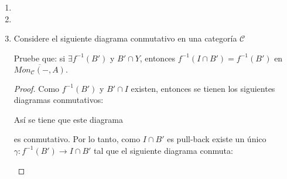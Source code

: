 \documentclass{article}
\begin{document}
\begin{enumerate}[label=\textbf{Ej \arabic*.}]
\begin{proof}
Veamos que $\nu$ es morfismo. Si $r\in R\,\,a,b\in J'$ donde $\nu(a)=[x]$, $\nu(b)=[y]$, $a=p'(x)$ y $b=p'(y)$, entonces 
\begin{gather*}
\nu(ra+b)=\nu(rp'(x)+p'(y))=\nu(p'(rx+y))\\
=[rx+y]=r[x]+[y]=r\nu(a)+\nu(b).
\end{gather*}

Así se tiene que $\forall a\in A\,\,\,\nu p'(a)=\nu(p'(a))=[a]=\pi(a)$ por lo que $(CoIm_2)$ se cumple y $Mod(R)$ tiene coimagenes.

\end{proof}


\item

\item

\item Considere el siguiente diagrama conmutativo en una categoría $\mathscr{C}$

\centerline{
}
Pruebe que: si $\exists f^{-1}(B')$ y $B'\cap Y$, entonces $f^{-1}(I\cap B')= f^{-1}(B')$ en $\overline{Mon_{\mathscr{C}}(-,A)}.$ 

\begin{proof}
Como $f^{-1}(B')$ y $B'\cap I$ existen, entonces se tienen los siguientes diagramas conmutativos:\\

\centerline{
}
Así se tiene que este diagrama

\centerline{
}
es conmutativo. Por lo tanto, como $I\cap B'$ es pull-back existe un único $ \gamma: f^{-1}(B')\to I\cap B'$ tal que el siguiente diagrama conmuta:\\

\centerline{
}


\end{proof}
\end{enumerate}
\end{document}
